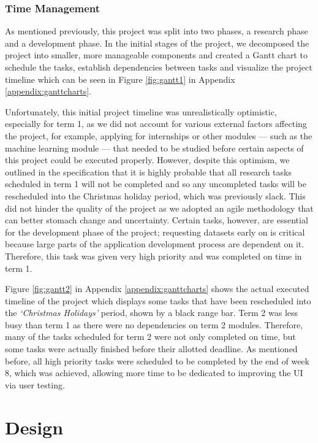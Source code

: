 \documentclass[12pt, a4paper]{article}
\newcommand{\np}
    {
    \vskip 0.4cm
    }
\begin{document}
\subsubsection{Time Management}

As mentioned previously, this project was split into two phases, a research phase and a development phase. In the initial stages of the project, we decomposed the project into smaller, more manageable components and created a Gantt chart to schedule the tasks, establish dependencies between tasks and visualize the project timeline which can be seen in Figure \ref{fig:gantt1} in Appendix \ref{appendix:ganttcharts}.
\np
Unfortunately, this initial project timeline was unrealistically optimistic, especially for term 1, as we did not account for various external factors affecting the project, for example, applying for internships or other modules --- such as the machine learning module --- that needed to be studied before certain aspects of this project could be executed properly. However, despite this optimism, we outlined in the specification that it is highly probable that all research tasks scheduled in term 1 will not be completed and so any uncompleted tasks will be rescheduled into the Christmas holiday period, which was previously slack. This did not hinder the quality of the project as we adopted an agile methodology that can better stomach change and uncertainty. Certain tasks, however, are essential for the development phase of the project; requesting datasets early on is critical because large parts of the application development process are dependent on it. Therefore, this task was given very high priority and was completed on time in term 1.
\np
Figure \ref{fig:gantt2} in Appendix \ref{appendix:ganttcharts} shows the actual executed timeline of the project which displays some tasks that have been rescheduled into the \textit{`Christmas Holidays'} period, shown by a black range bar. Term 2 was less busy than term 1 as there were no dependencies on term 2 modules. Therefore, many of the tasks scheduled for term 2 were not only completed on time, but some tasks were actually finished before their allotted deadline. As mentioned before, all high priority tasks were scheduled to be completed by the end of week 8, which was achieved, allowing more time to be dedicated to improving the UI via user testing.


\clearpage
\section{Design}
\label{design}
\end{document}
